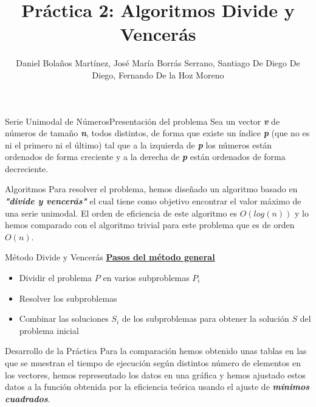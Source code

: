 \documentclass[12pt]{beamer}
\author{Daniel Bolaños Martínez, José María Borrás Serrano, Santiago De Diego De Diego, Fernando De la Hoz Moreno}
\title{Práctica 2: Algoritmos Divide y Vencerás}
\institute{ETSIIT}
\date{}
\begin{document}
\begin{frame}
\titlepage
\end{frame}

\begin{frame}{Serie Unimodal de Números}{Presentación del problema}
\justify
Sea un vector \textbf{\textit{v}} de números de tamaño \textbf{\textit{n}}, todos distintos, de forma que existe un índice \textbf{\textit{p}} (que no es ni el primero ni el último) tal que a la izquierda de \textbf{\textit{p}} los números están ordenados de forma creciente y a la derecha de \textbf{\textit{p}} están ordenados de forma decreciente. 
\end{frame}

\begin{frame}{Algoritmos}
\justify
Para resolver el problema, hemos diseñado un algoritmo basado en \textbf{\textit{"divide y vencerás"}} el cual tiene como objetivo encontrar el valor máximo de una serie unimodal. El orden de eficiencia de este algoritmo es $O(log(n))$ y lo hemos comparado con el algoritmo trivial para este problema que es de orden $O(n)$.
\end{frame}

\begin{frame}{Método Divide y Vencerás}
\textbf{\underline{Pasos del método general}}

\vspace{7mm} %

\begin{itemize}
\item Dividir el problema $P$ en varios subproblemas $P_i$

\vspace{7mm} %

\item Resolver los subproblemas

\vspace{7mm} %

\item Combinar las soluciones $S_i$ de los subproblemas para obtener la solución $S$ del problema inicial
\end{itemize}
\end{frame}

\begin{frame}{Desarrollo de la Práctica}
\justify
Para la comparación hemos obtenido unas tablas en las que se muestran el tiempo de ejecución según distintos número de elementos en los vectores, hemos representado los datos en una gráfica y hemos ajustado estos datos a la función obtenida por la eficiencia teórica usando el ajuste de \textbf{\textit{mínimos cuadrados}}.
\end{frame}
\end{document}
